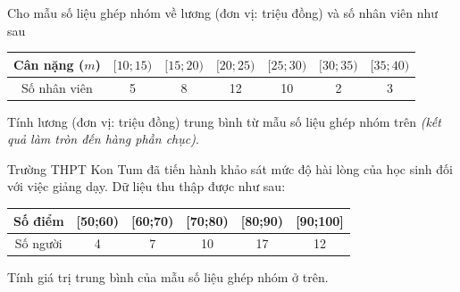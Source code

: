 \begin{bt}%
	 Cho mẫu số liệu ghép nhóm về lương (đơn vị: triệu đồng) và số nhân viên như sau
	\begin{center}
		\begin{tabular}{|c|c|c|c|c|c|c|}
			\hline Cân nặng ($m$) &{$[10;15)$}&{$[15;20)$}&{$[20;25)$}&{$[25;30)$}&{$[30;35)$}&{$[35;40)$}\\
			\hline Số nhân viên & 5 & 8 & 12 & 10 & 2 & 3 \\
			\hline
		\end{tabular}
	\end{center}
	Tính lương (đơn vị: triệu đồng) trung bình từ mẫu số liệu ghép nhóm trên {\it (kết quả làm tròn đến hàng phần chục)}.
\end{bt}

\begin{bt}%
	Trường THPT Kon Tum đã tiến hành khảo sát mức độ hài lòng của học sinh đối với việc giảng dạy. Dữ liệu thu thập được như sau:
	\begin{center}
		\begin{tabular}{|c|c|c|c|c|c|}
			\hline
			Số điểm &  [50;60) & [60;70) & [70;80) & [80;90) & [90;100]  \\
			\hline
			Số người & 4 & 7 & 10 & 17 & 12 \\
			\hline
		\end{tabular}
	\end{center}
	Tính giá trị trung bình của mẫu số liệu ghép nhóm ở trên.
\end{bt}

